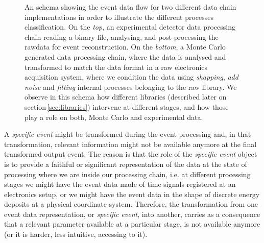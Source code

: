 \begin{figure}[h]
  \centering
	\caption{An schema showing the event data flow for two different data chain implementations in order to illustrate the different processes classification. On the \emph{top}, an experimental detector data processing chain reading a binary file, analysing, and post-processing the rawdata for event reconstruction. On the \emph{bottom}, a Monte Carlo generated data processing chain, where the data is analysed and transformed to match the data format in a raw electronics acquisition system, where we condition the data using \emph{shapping}, \emph{add noise} and \emph{fitting} internal processes belonging to the raw library. We observe in this schema how different libraries (described later on section\,\ref{sec:libraries}) intervene at different stages, and how those play a role on both, Monte Carlo and experimental data.}  \label{fig:dataChain}
\end{figure}

A \emph{specific event} might be transformed during the event processing and, in that transformation, relevant information might not be available anymore at the final transformed output event. The reason is that the role of the \emph{specific event} object is to provide a faithful or significant representation of the data at the state of processing where we are inside our processing chain, i.e. at different processing stages we might have the event data made of time signals registered at an electronics setup, or we might have the event data in the shape of discrete energy deposits at a physical coordinate system. Therefore, the transformation from one event data representation, or \emph{specific event}, into another, carries as a consequence that a relevant parameter available at a particular stage, is not available anymore (or it is harder, less intuitive, accessing to it). 

